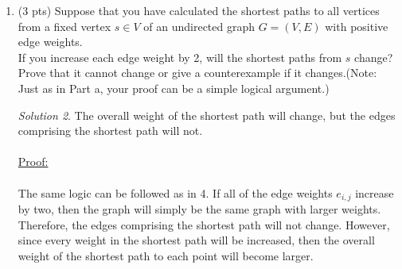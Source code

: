 \documentclass[12pt]{article}
\theoremstyle{remark}
\newtheorem*{solution}{Solution}
\begin{document}
\begin{enumerate}
\begin{solution}
\underline{Proof:} Spose' some integer $k$ is the weight of a some edge $\in$ G.\\ \\ If $k = j$ where $j = 2k$ then $\frac{j}{2} = k$ and $\frac{1}{2}\sum_{j=1}^{n} j = \sum_{k=1}^{n} k$ \\ \\ $\Rightarrow \frac{3}{2}+\frac{4}{2}+\frac{5}{2} + ... + \frac{2k}{2} = 1+2+3+...+k$ \\ \\ Since the two series are equal, it holds that if the each weight in the tree is increased by 2 then each weight of the MST will increase by 2 as well. Thus our MST will remain with the same edges in G. 

\end{solution}
\pagebreak

\item (3 pts) Suppose that you have calculated the shortest paths to all vertices from a fixed vertex $s\in V$ of an undirected graph $G=(V,E)$ with positive edge weights. \\
If you increase each edge weight by 2, will the shortest paths from $s$ change? Prove that it cannot change or give a counterexample if it changes.(Note: Just as in Part a, your proof can be a simple logical argument.)
\begin{solution}
The overall weight of the shortest path will change, but the edges comprising the shortest path will not. \\ \\ 
\underline{Proof:} \\ \\ The same logic can be followed as in 4. If all of the edge weights $e_{i,j}$ increase by two, then the graph will simply be the same graph with larger weights. Therefore, the edges comprising the shortest path will not change. However, since every weight in the shortest path will be increased, then the overall weight of the shortest path to each point will become larger.
\end{solution}

\pagebreak


\end{enumerate}
\end{document}
